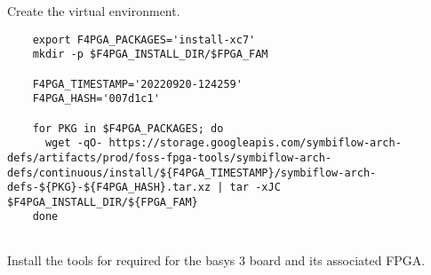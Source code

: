 Create the virtual environment. 

\begin{verbatim}
    export F4PGA_PACKAGES='install-xc7'
    mkdir -p $F4PGA_INSTALL_DIR/$FPGA_FAM

    F4PGA_TIMESTAMP='20220920-124259'
    F4PGA_HASH='007d1c1'
    
    for PKG in $F4PGA_PACKAGES; do
      wget -qO- https://storage.googleapis.com/symbiflow-arch-defs/artifacts/prod/foss-fpga-tools/symbiflow-arch-defs/continuous/install/${F4PGA_TIMESTAMP}/symbiflow-arch-defs-${PKG}-${F4PGA_HASH}.tar.xz | tar -xJC $F4PGA_INSTALL_DIR/${FPGA_FAM}
    done
    
\end{verbatim}

Install the tools for required for the basys 3 board and its associated FPGA.